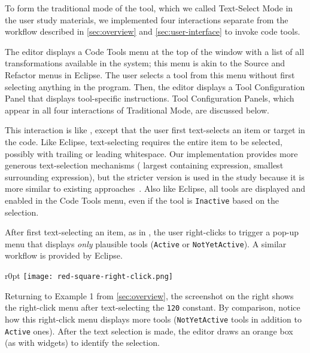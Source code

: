 
To form the traditional mode of the tool, which we called Text-Select Mode in
the user study materials, we implemented four interactions separate from the
workflow described in \autoref{sec:overview} and \autoref{sec:user-interface} to
invoke code tools.

\startInteractionList{}


The editor displays a Code Tools menu at the top of the window with a list
of all transformations available in the system; this menu is akin to the Source
and Refactor menus in Eclipse. The user selects a tool from this menu without
first selecting anything in the program. Then, the editor displays a Tool
Configuration Panel that displays tool-specific instructions. Tool Configuration
Panels, which appear in all four interactions of Traditional Mode,
are discussed below.


This interaction is like , except that the user first
text-selects an item or target in the code. Like Eclipse, text-selecting
requires the entire item to be selected, possibly with trailing or leading
whitespace. Our implementation provides more generous
text-selection mechanisms (\eg{} largest containing expression, smallest
surrounding expression), but the stricter version is used in the study because
it is more similar to existing approaches~\citep{Murphy-Hill-ICSE2008}. Also like
Eclipse, all tools are displayed and enabled in the Code Tools menu, even if the
tool is \verb+Inactive+ based on the selection.


After first text-selecting an item, as in , the user right-clicks
to trigger a pop-up menu that displays \emph{only} plausible tools
(\verb+Active+ or \verb+NotYetActive+).
A similar workflow is provided by Eclipse.

\begin{wrapfigure}{r}{0pt}
\texttt{[image: red-square-right-click.png]}
\end{wrapfigure}
Returning to Example 1 from \autoref{sec:overview},
the screenshot on the right shows the right-click menu after
text-selecting the \verb+120+ constant.
By comparison, notice how this right-click menu displays more tools
(\verb+NotYetActive+ tools in addition to \verb+Active+ ones).
After the text selection is made, the editor draws an
orange box (as with \deuce{} widgets) to identify the selection.

